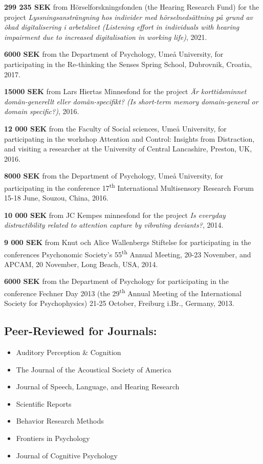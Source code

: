 \documentclass[]{article}
\begin{document}
\textbf{299 235 SEK} from Hörselforskningsfonden (the Hearing Research
Fund) for the project \emph{Lyssningsansträngning hos individer med
hörselnedsättning på grund av ökad digitalisering i arbetslivet
(Listening effort in individuals with hearing impairment due to
increased digitalisation in working life)}, 2021.

\textbf{6000 SEK} from the Department of Psychology, Umeå University,
for participating in the Re-thinking the Senses Spring School,
Dubrovnik, Croatia, 2017.

\textbf{15000 SEK} from Lars Hiertas Minnesfond for the project \emph{Är
korttidsminnet domän-generellt eller domän-specifikt? (Is short-term
memory domain-general or domain specific?)}, 2016.

\textbf{12 000 SEK} from the Faculty of Social sciences, Umeå
University, for participating in the workshop Attention and Control:
Insights from Distraction, and visiting a researcher at the University
of Central Lancashire, Preston, UK, 2016.

\textbf{8000 SEK} from the Department of Psychology, Umeå University,
for participating in the conference 17\textsuperscript{th} International
Multisensory Research Forum 15-18 June, Souzou, China, 2016.

\textbf{10 000 SEK} from JC Kempes minnesfond for the project \emph{Is
everyday distractibility related to attention capture by vibrating
deviants?}, 2014.

\textbf{9 000 SEK} from Knut och Alice Wallenbergs Stiftelse for
participating in the conferences Psychonomic Society's
55\textsuperscript{th} Annual Meeting, 20-23 November, and APCAM, 20
November, Long Beach, USA, 2014.

\textbf{6000 SEK} from the Department of Psychology for participating in
the conference Fechner Day 2013 (the 29\textsuperscript{th} Annual
Meeting of the International Society for Psychophysics) 21-25 October,
Freiburg i.Br., Germany, 2013.

\subsection{Peer-Reviewed for
Journals:}\label{peer-reviewed-for-journals}

\begin{itemize}
\item
  Auditory Perception \& Cognition
\item
  The Journal of the Acoustical Society of America
\item
  Journal of Speech, Language, and Hearing Research
\item
  Scientific Reports
\item
  Behavior Research Methods
\item
  Frontiers in Psychology
\item
  Journal of Cognitive Psychology
\end{itemize}
\end{document}
